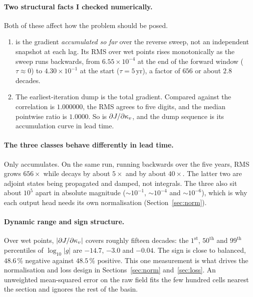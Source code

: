 \paragraph{Two structural facts I checked numerically.}
Both of these affect how the problem should be posed.

\begin{enumerate}
  \item {} is the gradient \emph{accumulated so far} over
        the reverse sweep, not an independent snapshot at each lag. Its RMS
        over wet points rises monotonically as the sweep runs backwards, from
        $6.55\times10^{-4}$ at the end of the forward window ($\tau\approx0$)
        to $4.30\times10^{-1}$ at the start ($\tau=5\,\mathrm{yr}$), a factor
        of $656$ or about $2.8$ decades.
  \item The earliest-iteration dump is the total gradient. Compared against
         the correlation is $1.000000$, the RMS agrees to
        five digits, and the median pointwise ratio is $1.0000$. So
         is $\partial J/\partial\kappa_{v}$, and the dump sequence
        is its accumulation curve in lead time.
\end{enumerate}

\paragraph{The three classes behave differently in lead time.}
Only  accumulates. On the same run, running backwards over the
five years,  RMS grows $656\times$ while  decays
by about $5\times$ and  by about $40\times$. The latter two are
adjoint states being propagated and damped, not integrals. The three also sit
about $10^{5}$ apart in absolute magnitude ($\sim\!10^{-1}$, $\sim\!10^{-4}$
and $\sim\!10^{-6}$), which is why each output head needs its own
normalisation (Section~\ref{sec:norm}).

\paragraph{Dynamic range and sign structure.}
Over wet points, $|\partial J/\partial\kappa_{v}|$ covers roughly fifteen decades: the
$1^{\text{st}}$, $50^{\text{th}}$ and $99^{\text{th}}$ percentiles of
$\log_{10}|g|$ are $-14.7$, $-3.0$ and $-0.04$. The sign is close to balanced,
$48.6\,\%$ negative against $48.5\,\%$ positive. This one measurement is what
drives the normalisation and loss design in Sections~\ref{sec:norm}
and~\ref{sec:loss}. An unweighted mean-squared error on the raw field fits the
few hundred cells nearest the section and ignores the rest of the basin.

